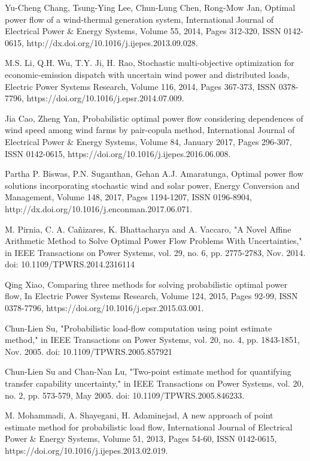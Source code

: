 \begin{thebibliography}{99}
\begin{singlespace}
Yu-Cheng Chang, Tsung-Ying Lee, Chun-Lung Chen, Rong-Mow Jan, Optimal power flow of a wind-thermal generation system, International Journal of Electrical Power \& Energy Systems, Volume 55, 2014, Pages 312-320, ISSN 0142-0615, http://dx.doi.org/10.1016/j.ijepes.2013.09.028.

 M.S. Li, Q.H. Wu, T.Y. Ji, H. Rao, Stochastic multi-objective optimization for economic-emission dispatch with uncertain wind power and distributed loads, Electric Power Systems Research, Volume 116, 2014, Pages 367-373, ISSN 0378-7796, https://doi.org/10.1016/j.epsr.2014.07.009.

Jia Cao, Zheng Yan, Probabilistic optimal power flow considering dependences of wind speed among wind farms by pair-copula method, International Journal of Electrical Power \& Energy Systems, Volume 84, January 2017, Pages 296-307, ISSN 0142-0615, https://doi.org/10.1016/j.ijepes.2016.06.008.

Partha P. Biswas, P.N. Suganthan, Gehan A.J. Amaratunga, Optimal power flow solutions incorporating stochastic wind and solar power, Energy Conversion and Management, Volume 148, 2017, Pages 1194-1207, ISSN 0196-8904, http://dx.doi.org/10.1016/j.enconman.2017.06.071.

M. Pirnia, C. A. Cañizares, K. Bhattacharya and A. Vaccaro, "A Novel Affine Arithmetic Method to Solve Optimal Power Flow Problems With Uncertainties," in IEEE Transactions on Power Systems, vol. 29, no. 6, pp. 2775-2783, Nov. 2014. doi: 10.1109/TPWRS.2014.2316114

Qing Xiao, Comparing three methods for solving probabilistic optimal power flow, In Electric Power Systems Research, Volume 124, 2015, Pages 92-99, ISSN 0378-7796, https://doi.org/10.1016/j.epsr.2015.03.001.

 Chun-Lien Su, "Probabilistic load-flow computation using point estimate method," in IEEE Transactions on Power Systems, vol. 20, no. 4, pp. 1843-1851, Nov. 2005. doi: 10.1109/TPWRS.2005.857921

 Chun-Lien Su and Chan-Nan Lu, "Two-point estimate method for quantifying transfer capability uncertainty," in IEEE Transactions on Power Systems, vol. 20, no. 2, pp. 573-579, May 2005.
doi: 10.1109/TPWRS.2005.846233.

 M. Mohammadi, A. Shayegani, H. Adaminejad, A new approach of point estimate method for probabilistic load flow, International Journal of Electrical Power \& Energy Systems, Volume 51, 2013, Pages 54-60, ISSN 0142-0615, https://doi.org/10.1016/j.ijepes.2013.02.019.


\end{singlespace}
\end{thebibliography}
